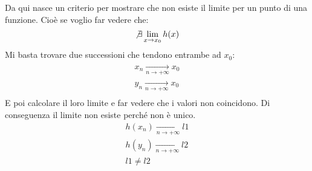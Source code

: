 Da qui nasce un criterio per mostrare che non esiste il limite per un punto di 
una funzione. Cioè se voglio far vedere che:
\begin{equation*}
	\not \exists \lim_{x \to x_0} h(x)
\end{equation*}
Mi basta trovare due successioni che tendono entrambe ad $x_0$:
\begin{align*}
	x_n \xrightarrow[n \to + \infty]{} x_0\\
	y_n \xrightarrow[n \to + \infty]{} x_0\\
\end{align*}
E poi calcolare il loro limite e far vedere che i valori non coincidono. Di 
conseguenza il limite non esiste perché non è unico.
\begin{gather*}
	h(x_n) \xrightarrow[n \to +\infty]{} l1\\
	h(y_n) \xrightarrow[n \to +\infty]{} l2\\
	l1 \neq l2
\end{gather*}

